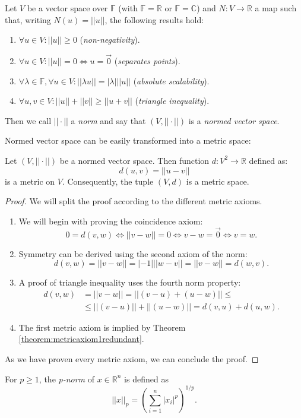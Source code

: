 \begin{definition}
	Let $V$ be a vector space over $\mathbb{F}$ (with $\mathbb{F} = \mathbb{R}$ or $\mathbb{F} = \mathbb{C}$) and $N:V \rightarrow \mathbb{R}$ a map such that, writing $N(u)=||u||$, the following results hold:
	\begin{enumerate}
		\item $\forall u \in V: ||u||\ge 0$ (\emph{non-negativity}).
		\item $\forall u \in V: ||u|| = 0 \iff u = \overrightarrow{0}$ (\emph{separates points}).
		\item $\forall \lambda \in \mathbb{F}, \forall u \in V: ||\lambda u||=|\lambda|||u||$ (\emph{absolute scalability}).
		\item $\forall u,v \in V: ||u||+||v|| \ge ||u+v||$ (\emph{triangle inequality}).
	\end{enumerate}
	Then we call $||\cdot||$ a \emph{norm} and say that $(V, ||\cdot||)$ is a \emph{normed vector space}.
\end{definition}
Normed vector space can be easily transformed into a metric space:
\begin{theorem}
	\label{theorem:metricfromnorm}
	Let  $(V, ||\cdot||)$ be a normed vector space. Then function $d: V^2 \rightarrow \mathbb{R}$ defined as:
	\begin{equation}
	d(u,v) = ||u-v||
	\end{equation}
	is a metric on $V$. Consequently, the tuple $(V, d)$ is a metric space.
	\begin{proof}
		We will split the proof according to the different metric axioms.
		\begin{enumerate}		
			\item We will begin with proving the coincidence axiom:	
			$$0 = d(v,w) \iff ||v-w|| =0 \iff v - w = \overrightarrow{0} \iff v = w.$$
			\item Symmetry can be derived using the second axiom of the norm:
			\begin{equation}
			d(v,w)=||v-w||=|-1|||w-v||=||v-w||=d(w,v).
			\end{equation}
			\item A proof of triangle inequality uses the fourth norm property:
			\begin{align}
			d(v,w) &= ||v-w||=||(v-u)+(u-w)|| \le \\
			& \le ||(v-u)||+||(u-w)||=d(v,u)+d(u,w).
			\end{align}
			\item 	The first metric axiom is implied by Theorem \ref{theorem:metricaxiom1redundant}. 	 
		\end{enumerate}
	As we have proven every metric axiom, we can conclude the proof.
	\end{proof}
\end{theorem}
\begin{definition}
	For $p \ge 1$, the \emph{p-norm} of $x \in \mathbb{R}^n$ is defined as $$||x||_p = {\left( \sum_{i=1}^{n}|x_i|^p \right)}^{1/p}.$$
\end{definition}


